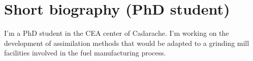 \documentclass[a4paper,10pt,oneside]{article}
\begin{document}
\section*{Short biography (PhD student)}

I'm a PhD student in the CEA center of Cadarache. I'm working on the development of assimilation methods that would be adapted to a grinding mill facilities involved in the fuel manufacturing process.



\end{document}
